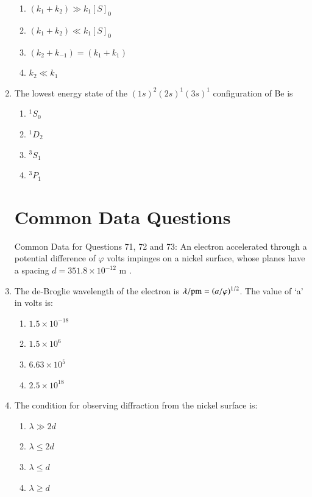 \documentclass[12pt]{article}
\begin{document}
\begin{enumerate}
\begin{enumerate}
\item   $(k_1 + k_2) \gg k_1 [S]_0$
\item   $(k_1 + k_2) \ll k_1 [S]_0$ 
\item   $(k_2 + k_{-1}) = (k_1 + k_1)$ 
\item   $k_2 \ll k_1$
\end{enumerate}    \hfill{}


\item The lowest energy state of the $(1s)^2(2s)^1(3s)^1$ configuration of Be is

\begin{enumerate}
\item $^1S_0$
\item $^1D_2$
\item $^3S_1$
\item $^3P_1$
\end{enumerate}    \hfill{}



\section*{Common Data Questions}

{Common Data for Questions 71, 72 and 73:} 
An electron accelerated through a potential difference of $\varphi$ volts impinges on a nickel surface, whose  planes have a spacing $d = 351.8 \times 10^{-12}$ m .


    \item The de-Broglie wavelength of the electron is $\lambda/\text{pm} = \left(a/\varphi\right)^{1/2}$. The value of ‘a’ in volts is:
    \begin{enumerate}
        \item $1.5 \times 10^{-18}$
        \item $1.5 \times 10^6$
        \item $6.63 \times 10^5$
        \item $2.5 \times 10^{18}$
    \end{enumerate}    \hfill{}


    \item The condition for observing diffraction from the nickel surface is:
    \begin{enumerate}
        \item $\lambda \gg 2d$
        \item $\lambda \leq 2d$
        \item $\lambda \leq d$
        \item $\lambda \geq d$
    \end{enumerate}    \hfill{}



\end{enumerate}
\end{document}
